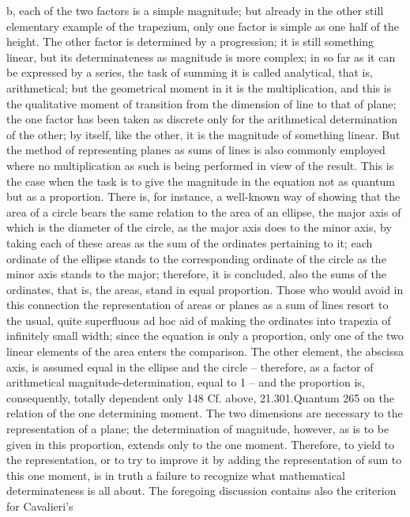 b, each of the two factors is a simple magnitude; but already in the other
still elementary example of the trapezium, only one factor is simple as
one half of the height. The other factor is determined by a progression;
it is still something linear, but its determinateness as magnitude is more
complex; in so far as it can be expressed by a series, the task of summing it
is called analytical, that is, arithmetical; but the geometrical moment in it
is the multiplication, and this is the qualitative moment of transition from
the dimension of line to that of plane; the one factor has been taken as
discrete only for the arithmetical determination of the other; by itself, like
the other, it is the magnitude of something linear.
But the method of representing planes as sums of lines is also commonly
employed where no multiplication as such is being performed in view of
the result. This is the case when the task is to give the magnitude in the
equation not as quantum but as a proportion. There is, for instance, a
well-known way of showing that the area of a circle bears the same relation
to the area of an ellipse, the major axis of which is the diameter of the
circle, as the major axis does to the minor axis, by taking each of these
areas as the sum of the ordinates pertaining to it; each ordinate of the ellipse
stands to the corresponding ordinate of the circle as the minor axis stands
to the major; therefore, it is concluded, also the sums of the ordinates, that
is, the areas, stand in equal proportion. Those who would avoid in this
connection the representation of areas or planes as a sum of lines resort
to the usual, quite superfluous ad hoc aid of making the ordinates into
trapezia of infinitely small width; since the equation is only a proportion,
only one of the two linear elements of the area enters the comparison.
The other element, the abscissa axis, is assumed equal in the ellipse and
the circle – therefore, as a factor of arithmetical magnitude-determination,
equal to 1 – and the proportion is, consequently, totally dependent only
148
Cf. above, 21.301.Quantum
265
on the relation of the one determining moment. The two dimensions are
necessary to the representation of a plane; the determination of magnitude,
however, as is to be given in this proportion, extends only to the one
moment. Therefore, to yield to the representation, or to try to improve
it by adding the representation of sum to this one moment, is in truth a
failure to recognize what mathematical determinateness is all about.
The foregoing discussion contains also the criterion for Cavalieri’s
